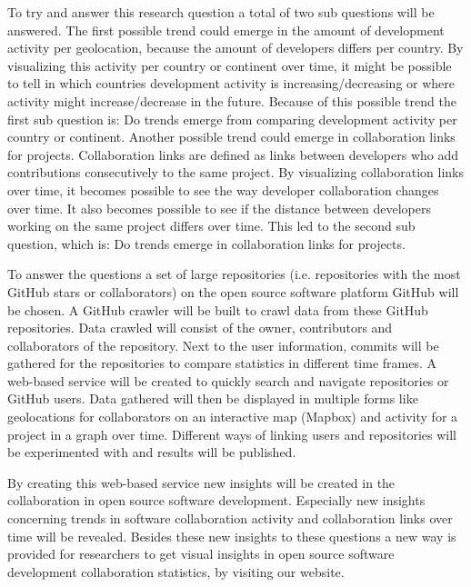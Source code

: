 \documentclass[acmtog, authorversion]{acmart}
\begin{document}
To try and answer this research question a total of two sub questions will be answered. The first possible trend could emerge in the amount of development activity per geolocation, because the amount of developers differs per country. By visualizing this activity per country or continent over time, it might be possible to tell in which countries development activity is increasing/decreasing or where activity might increase/decrease in the future. Because of this possible trend the first sub question is: Do trends emerge from comparing development activity per country or continent. Another possible trend could emerge in collaboration links for projects. Collaboration links are defined as links between developers who add contributions consecutively to the same project. By visualizing collaboration links over time, it becomes possible to see the way developer collaboration changes over time. It also becomes possible to see if the distance between developers working on the same project differs over time. This led to the second sub question, which is: Do trends emerge in collaboration links for projects.  

To answer the questions a set of large repositories (i.e. repositories with the most GitHub stars or collaborators) on the open source software platform GitHub will be chosen. A GitHub crawler will be built to crawl data from these GitHub repositories. Data crawled will consist of the owner, contributors and collaborators of the repository. Next to the user information, commits will be gathered for the repositories to compare statistics in different time frames. 
A web-based service will be created to quickly search and navigate repositories or GitHub users. Data gathered will then be displayed in multiple forms like geolocations for collaborators on an interactive map (Mapbox) and activity for a project in a graph over time. 
Different ways of linking users and repositories will be experimented with and results will be published.

By creating this web-based service new insights will be created in the collaboration in open source software development. Especially new insights concerning trends in software collaboration activity and collaboration links over time will be revealed. Besides these new insights to these questions a new way is provided for researchers to get visual insights in open source software development collaboration statistics, by visiting our website.



\end{document}
